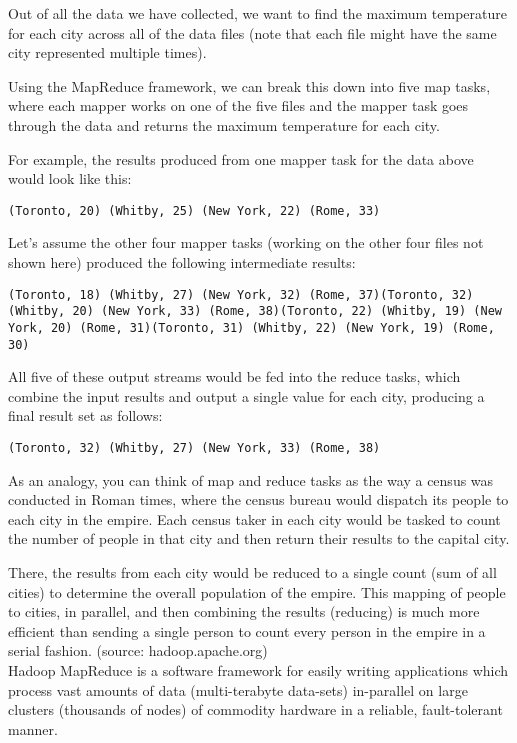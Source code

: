 \documentclass[11pt]{article} %
\begin{document}
Out of all the data we have collected, we want to find the maximum temperature for each city across all of the data files (note that each file might have the same city represented multiple times). 

Using the MapReduce framework, we can break this down into five map tasks, where each mapper works on one of the five files and the mapper task goes through the data and returns the maximum temperature for each city. 

For example, the results produced from one mapper task for the data above would look like this:
\begin{verbatim}
(Toronto, 20) (Whitby, 25) (New York, 22) (Rome, 33)
\end{verbatim}

Let’s assume the other four mapper tasks (working on the other four files not shown here) produced the following intermediate results:
\begin{verbatim}
(Toronto, 18) (Whitby, 27) (New York, 32) (Rome, 37)(Toronto, 32) (Whitby, 20) (New York, 33) (Rome, 38)(Toronto, 22) (Whitby, 19) (New York, 20) (Rome, 31)(Toronto, 31) (Whitby, 22) (New York, 19) (Rome, 30)
\end{verbatim}
All five of these output streams would be fed into the reduce tasks, which combine the input results and output a single value for each city, producing a final result set as follows:
\begin{verbatim}
(Toronto, 32) (Whitby, 27) (New York, 33) (Rome, 38)
\end{verbatim}
As an analogy, you can think of map and reduce tasks as the way a census was conducted in 
Roman times, where the census bureau would dispatch its people to each city in the empire. 
Each census taker in each city would be tasked to count the number of people in that 
city and then return their results to the capital city. 

There, the results from each city would be reduced to a single count (sum of all cities) 
to determine the overall population of the empire. This mapping of people to cities, 
in parallel, and then combining the results (reducing) is much more efficient than 
sending a single person to count every person in the empire in a serial fashion.
\bigskip
(source: hadoop.apache.org)\\
Hadoop MapReduce is a software framework for easily writing applications which process vast amounts of data (multi-terabyte data-sets) in-parallel on large clusters (thousands of nodes) of commodity hardware in a reliable, fault-tolerant manner.
\end{document}
